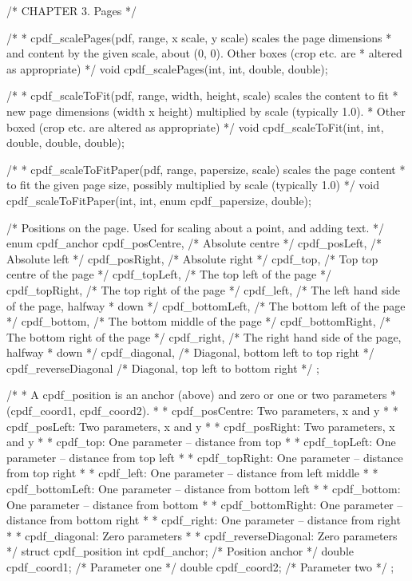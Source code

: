 /* CHAPTER 3. Pages */

/*
 * cpdf_scalePages(pdf, range, x scale, y scale) scales the page dimensions
 * and content by the given scale, about (0, 0). Other boxes (crop etc. are
 * altered as appropriate)
 */
void cpdf_scalePages(int, int, double, double);

/*
 * cpdf_scaleToFit(pdf, range, width, height, scale) scales the content to fit
 * new page dimensions (width x height) multiplied by scale (typically 1.0).
 * Other boxed (crop etc. are altered as appropriate)
 */
void cpdf_scaleToFit(int, int, double, double, double);

/*
 * cpdf_scaleToFitPaper(pdf, range, papersize, scale) scales the page content
 * to fit the given page size, possibly multiplied by scale (typically 1.0)
 */
void cpdf_scaleToFitPaper(int, int, enum cpdf_papersize, double);

/* Positions on the page. Used for scaling about a point, and adding text. */
enum cpdf_anchor {
  cpdf_posCentre,      /* Absolute centre */
  cpdf_posLeft,        /* Absolute left */
  cpdf_posRight,       /* Absolute right */
  cpdf_top,            /* Top top centre of the page */
  cpdf_topLeft,        /* The top left of the page */
  cpdf_topRight,       /* The top right of the page */
  cpdf_left,           /* The left hand side of the page, halfway
                        * down */
  cpdf_bottomLeft,     /* The bottom left of the page */
  cpdf_bottom,         /* The bottom middle of the page */
  cpdf_bottomRight,    /* The bottom right of the page */
  cpdf_right,          /* The right hand side of the page, halfway
                        * down */
  cpdf_diagonal,       /* Diagonal, bottom left to top right */
  cpdf_reverseDiagonal /* Diagonal, top left to bottom right */
};

/*
 * A cpdf_position is an anchor (above) and zero or one or two parameters
 * (cpdf_coord1, cpdf_coord2).
 *
 * cpdf_posCentre: Two parameters, x and y
 *
 * cpdf_posLeft: Two parameters, x and y
 *
 * cpdf_posRight: Two parameters, x and y
 *
 * cpdf_top: One parameter -- distance from top
 *
 * cpdf_topLeft: One parameter -- distance from top left
 *
 * cpdf_topRight: One parameter -- distance from top right
 *
 * cpdf_left: One parameter -- distance from left middle
 *
 * cpdf_bottomLeft: One parameter -- distance from bottom left
 *
 * cpdf_bottom: One parameter -- distance from bottom
 *
 * cpdf_bottomRight: One parameter -- distance from bottom right
 *
 * cpdf_right: One parameter -- distance from right
 *
 * cpdf_diagonal: Zero parameters
 *
 * cpdf_reverseDiagonal: Zero parameters
 */
struct cpdf_position {
  int cpdf_anchor;    /* Position anchor */
  double cpdf_coord1; /* Parameter one */
  double cpdf_coord2; /* Parameter two */
};

